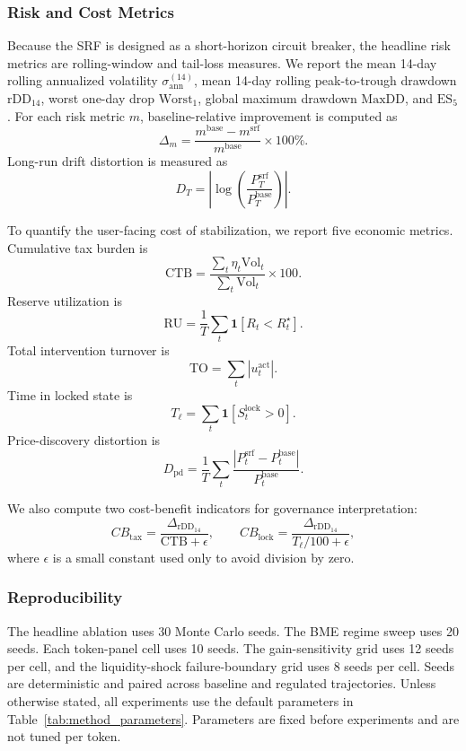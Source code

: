 \documentclass[a4paper,fleqn]{cas-dc}
\begin{document}
\subsubsection{Risk and Cost Metrics}

Because the SRF is designed as a short-horizon circuit breaker, the headline risk metrics are rolling-window and tail-loss measures. We report the mean 14-day rolling annualized volatility \(\sigma_{\mathrm{ann}}^{(14)}\), mean 14-day rolling peak-to-trough drawdown \(\mathrm{rDD}_{14}\), worst one-day drop \(\mathrm{Worst}_1\), global maximum drawdown \(\mathrm{MaxDD}\), and \(\mathrm{ES}_5\). For each risk metric \(m\), baseline-relative improvement is computed as
\[
\Delta_m
=
\frac{m^{\mathrm{base}}-m^{\mathrm{srf}}}{m^{\mathrm{base}}}
\times 100\%.
\]
Long-run drift distortion is measured as
\[
D_T =
\left|
\log
\left(
\frac{P_T^{\mathrm{srf}}}{P_T^{\mathrm{base}}}
\right)
\right|.
\]

To quantify the user-facing cost of stabilization, we report five economic metrics. Cumulative tax burden is
\[
\mathrm{CTB}
=
\frac{\sum_t \eta_t \mathrm{Vol}_t}
{\sum_t \mathrm{Vol}_t}
\times 100.
\]
Reserve utilization is
\[
\mathrm{RU}
=
\frac{1}{T}
\sum_t
\mathbf{1}
\left[
R_t<R_t^{\star}
\right].
\]
Total intervention turnover is
\[
\mathrm{TO}
=
\sum_t
|u_t^{\mathrm{act}}|.
\]
Time in locked state is
\[
T_\ell
=
\sum_t
\mathbf{1}
\left[
S_t^{\mathrm{lock}}>0
\right].
\]
Price-discovery distortion is
\[
D_{\mathrm{pd}}
=
\frac{1}{T}
\sum_t
\frac{
|P_t^{\mathrm{srf}}-P_t^{\mathrm{base}}|
}{
P_t^{\mathrm{base}}
}.
\]

We also compute two cost-benefit indicators for governance interpretation:
\[
CB_{\mathrm{tax}}
=
\frac{
\Delta_{\mathrm{rDD}_{14}}
}{
\mathrm{CTB}+\epsilon
},
\qquad
CB_{\mathrm{lock}}
=
\frac{
\Delta_{\mathrm{rDD}_{14}}
}{
T_\ell/100+\epsilon
},
\]
where \(\epsilon\) is a small constant used only to avoid division by zero.

\subsubsection{Reproducibility}

The headline ablation uses 30 Monte Carlo seeds. The BME regime sweep uses 20 seeds. Each token-panel cell uses 10 seeds. The gain-sensitivity grid uses 12 seeds per cell, and the liquidity-shock failure-boundary grid uses 8 seeds per cell. Seeds are deterministic and paired across baseline and regulated trajectories. Unless otherwise stated, all experiments use the default parameters in Table~\ref{tab:method_parameters}. Parameters are fixed before experiments and are not tuned per token.
\end{document}
